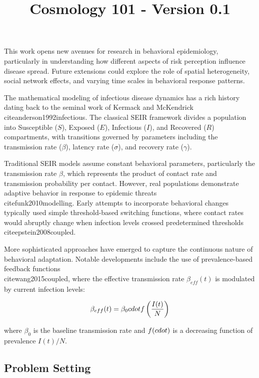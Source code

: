 \documentclass{article}\usepackage{graphicx} \usepackage{amsmath} \usepackage{colortbl}\title{Cosmology 101 - Version 0.1}
\begin{document}
This work opens new avenues for research in behavioral epidemiology, particularly in understanding how different aspects of risk perception influence disease spread. Future extensions could explore the role of spatial heterogeneity, social network effects, and varying time scales in behavioral response patterns.

The mathematical modeling of infectious disease dynamics has a rich history dating back to the seminal work of Kermack and McKendrick \\cite{anderson1992infectious}. The classical SEIR framework divides a population into Susceptible ($S$), Exposed ($E$), Infectious ($I$), and Recovered ($R$) compartments, with transitions governed by parameters including the transmission rate ($\beta$), latency rate ($\sigma$), and recovery rate ($\gamma$).

Traditional SEIR models assume constant behavioral parameters, particularly the transmission rate $\beta$, which represents the product of contact rate and transmission probability per contact. However, real populations demonstrate adaptive behavior in response to epidemic threats \\cite{funk2010modelling}. Early attempts to incorporate behavioral changes typically used simple threshold-based switching functions, where contact rates would abruptly change when infection levels crossed predetermined thresholds \\cite{epstein2008coupled}.

More sophisticated approaches have emerged to capture the continuous nature of behavioral adaptation. Notable developments include the use of prevalence-based feedback functions \\cite{wang2015coupled}, where the effective transmission rate $\beta_{eff}(t)$ is modulated by current infection levels:

\begin{equation}
\beta_{eff}(t) = \beta_0 \\cdot f\left(\frac{I(t)}{N}\right)
\end{equation}

where $\beta_0$ is the baseline transmission rate and $f(\\cdot)$ is a decreasing function of prevalence $I(t)/N$.

\subsection{Problem Setting}
\end{document}
